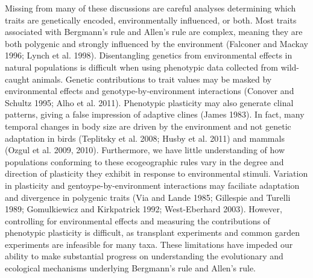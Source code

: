 \documentclass[]{article}
\begin{document}
Missing from many of these discussions are careful analyses determining
which traits are genetically encoded, environmentally influenced, or
both. Most traits associated with Bergmann's rule and Allen's rule are
complex, meaning they are both polygenic and strongly influenced by the
environment (Falconer and Mackay 1996; Lynch et al. 1998). Disentangling
genetics from environmental effects in natural populations is difficult
when using phenotypic data collected from wild-caught animals. Genetic
contributions to trait values may be masked by environmental effects and
genotype-by-environment interactions (Conover and Schultz 1995; Alho et
al. 2011). Phenotypic plasticity may also generate clinal patterns,
giving a false impression of adaptive clines (James 1983). In fact, many
temporal changes in body size are driven by the environment and not
genetic adaptation in birds (Teplitsky et al. 2008; Husby et al. 2011)
and mammals (Ozgul et al. 2009, 2010). Furthermore, we have little
understanding of how populations conforming to these ecogeographic rules
vary in the degree and direction of plasticity they exhibit in response
to environmental stimuli. Variation in plasticity and
gentoype-by-environment interactions may faciliate adaptation and
divergence in polygenic traits (Via and Lande 1985; Gillespie and
Turelli 1989; Gomulkiewicz and Kirkpatrick 1992; West-Eberhard 2003).
However, controlling for environmental effects and measuring the
contributions of phenotypic plasticity is difficult, as transplant
experiments and common garden experiments are infeasible for many taxa.
These limitations have impeded our ability to make substantial progress
on understanding the evolutionary and ecological mechanisms underlying
Bergmann's rule and Allen's rule.
\end{document}
